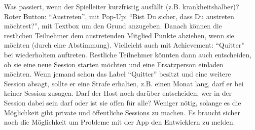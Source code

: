 \begin{appendix}
\begin{itemize}
    \newline
    Was passiert, wenn der Spielleiter kurzfristig ausfällt (z.B. krankheitshalber)?
    \newline
    Roter Button: “Austreten”, mit Pop-Up: “Bist Du sicher, dass Du austreten möchtest?”, mit Textbox um den Grund anzugeben. Danach können die restlichen Teilnehmer dem austretenden Mitglied Punkte abziehen, wenn sie möchten (durch eine Abstimmung). Vielleicht auch mit Achievement: “Quitter” bei wiederholtem auftreten. Restliche Teilnehmer könnten dann auch entscheiden, ob sie eine neue Session starten möchten und eine Ersatzperson einladen möchten. Wenn jemand schon das Label “Quitter” besitzt und eine weitere Session absagt, sollte er eine Strafe erhalten, z.B. einen Monat lang, darf er bei keiner Session zusagen.
    \newline
    Darf der Host noch darüber entscheiden, wer in der Session dabei sein darf oder ist sie offen für alle?
    \newline
    Weniger nötig, solange es die Möglichkeit gibt private und öffentliche Sessions zu machen.
    \newline
    Es braucht sicher noch die Möglichkeit um Probleme mit der App den Entwicklern zu melden.
\end{itemize}
\end{appendix}